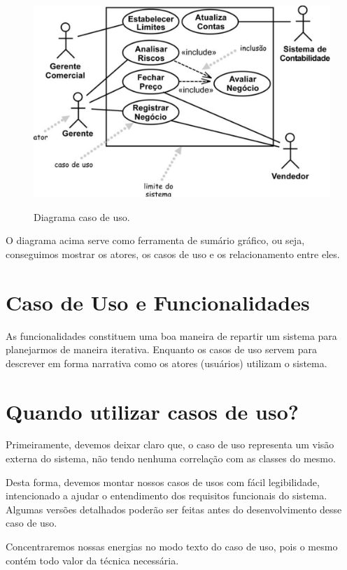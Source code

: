 \documentclass[a4paper, 12pt]{report}
\begin{document}
	\begin{figure}[H]
		\centering
		\includegraphics[scale=0.5]{diagrama.png}
		\label{diagramaCasoDeUso}
		\caption{Diagrama caso de uso.}
	\end{figure}
	
	O diagrama acima serve como ferramenta de sumário gráfico, ou seja, conseguimos mostrar os atores, os casos de uso e os relacionamento entre eles.
	
	\section{Caso de Uso e Funcionalidades}
	
	As funcionalidades constituem uma boa maneira de repartir	 um sistema para planejarmos de maneira iterativa. Enquanto os casos de uso servem para descrever em forma narrativa como os atores (usuários) utilizam o sistema.
	
	
	\section{Quando utilizar casos de uso?}
	
	Primeiramente, devemos deixar claro que, o caso de uso representa um visão externa do sistema, não tendo nenhuma correlação com as classes do mesmo.
	
	Desta forma, devemos montar nossos casos de usos com fácil legibilidade, intencionado a ajudar o entendimento dos requisitos funcionais do sistema. Algumas versões detalhados poderão ser feitas antes do desenvolvimento desse caso de uso.
	
	Concentraremos nossas energias no modo texto do caso de uso, pois o mesmo contém todo valor da técnica necessária.
	
	
\end{document}
